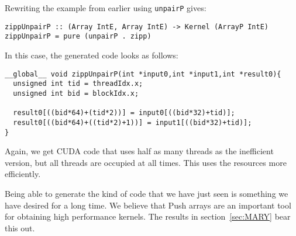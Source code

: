 Rewriting the example from earlier using {\tt unpairP} gives:

\begin{codesize}
\begin{verbatim}
zippUnpairP :: (Array IntE, Array IntE) -> Kernel (ArrayP IntE) 
zippUnpairP = pure (unpairP . zipp)
\end{verbatim}
\end{codesize}

\noindent
In this case, the generated code looks as follows: 

\begin{codesize}
\begin{verbatim}
__global__ void zippUnpairP(int *input0,int *input1,int *result0){
  unsigned int tid = threadIdx.x;
  unsigned int bid = blockIdx.x;
  
  result0[((bid*64)+(tid*2))] = input0[((bid*32)+tid)];
  result0[((bid*64)+((tid*2)+1))] = input1[((bid*32)+tid)];
}
\end{verbatim}
\end{codesize}

\noindent
Again, we get CUDA code that uses half as many threads as the inefficient 
version, but all threads are occupied at all times. This uses
the resources more efficiently. 


Being able to generate the kind of code that we have just seen is something we have desired for a long time. We believe that 
Push arrays are an important tool for obtaining high performance kernels. The results 
in section~\ref{sec:MARY} bear this out. 


























